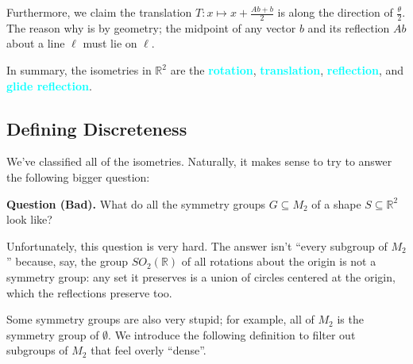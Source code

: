 Furthermore, we claim the translation $T: x \mapsto x + \frac{Ab + b}{2}$ is along the direction of $\frac{\theta}{2}$.  The reason why is by geometry; the midpoint of any vector $b$ and its reflection $Ab$ about a line $\ell$ must lie on $\ell$. \vspace{0.1cm}


In summary, the isometries in $\mathbb{R}^2$ are the \textcolor{cyan}{\textbf{rotation}}, \textcolor{cyan}{\textbf{translation}}, \textcolor{cyan}{\textbf{reflection}}, and \textcolor{cyan}{\textbf{glide reflection}}.

\subsection{Defining Discreteness}

We've classified all of the isometries.  Naturally, it makes sense to try to answer the following bigger question:

\begin{boxed-text}[42em]
\textbf{Question (Bad).} What do all the symmetry groups $G \subseteq M_2$ of a shape $S \subseteq \mathbb{R}^2$ look like?
\end{boxed-text}

Unfortunately, this question is very hard.  The answer isn't ``every subgroup of $M_2$'' because, say, the group $SO_2(\mathbb{R})$ of all rotations about the origin is not a symmetry group: any set it preserves is a union of circles centered at the origin, which the reflections preserve too.

Some symmetry groups are also very stupid; for example, all of $M_2$ is the symmetry group of $\emptyset$.  We introduce the following definition to filter out subgroups of $M_2$ that feel overly ``dense''.

